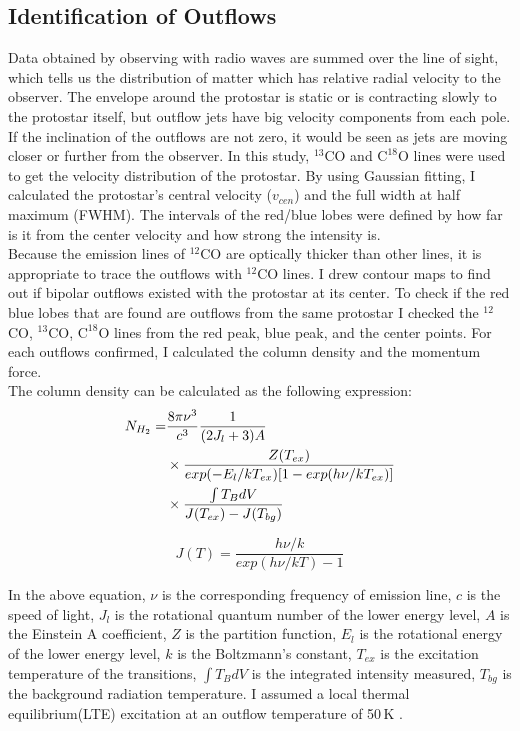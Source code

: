 \subsection{Identification of Outflows}
Data obtained by observing with radio waves are summed over the line of sight, which tells us the distribution of matter which has relative radial velocity to the observer. The envelope around the protostar is static or is contracting slowly to the protostar itself, but outflow jets have big velocity components from each pole. If the inclination of the outflows are not zero, it would be seen as jets are moving closer or further from the observer. In this study, $^{13}$CO and $\textrm{C}^{18}\textrm{O}$ lines were used to get the velocity distribution of the protostar. By using Gaussian fitting, I calculated the protostar’s central velocity ($v_{cen}$) and the full width at half maximum (FWHM). The intervals of the red/blue lobes were defined by how far is it from the center velocity and how strong the intensity is. \\
Because the emission lines of $^{12}$CO are optically thicker than other lines, it is appropriate to trace the outflows with $^{12}$CO lines. I drew contour maps to find out if bipolar outflows existed with the protostar at its center. To check if the red blue lobes that are found are outflows from the same protostar I checked the $^{12}$CO, $^{13}$CO, $\textrm{C}^{18}\textrm{O}$ lines from the red peak, blue peak, and the center points. For each outflows confirmed, I calculated the column density and the momentum force.\\


The column density can be calculated as the following expression:
\begin{align}
N_{H_2} =& \frac{8\pi \nu^3}{c^3} \frac{1}{(2J_l +3)A}  \notag \\
& \times \frac{Z(T_{ex})}{exp(-E_l / kT_{ex})[1-exp(h\nu / kT_{ex})]} \notag \\
& \times \frac{\int T_B dV}{J(T_{ex})-J(T_{bg})}
\end{align}

\begin{equation}
J(T) = \frac{h \nu / k}{exp(h\nu / kT)-1}
\end{equation}

In the above equation, $\nu$ is the corresponding frequency of emission line, $c$ is the speed of light, $J_l$ is the rotational quantum number of the lower energy level, $A$ is the Einstein A coefficient, $Z$ is the partition function, $E_l$ is the rotational energy of the lower energy level, $k$ is the Boltzmann's constant, $T_{ex}$ is the excitation temperature of the transitions, $\int T_B dV$ is the integrated intensity measured, $T_{bg}$ is the background radiation temperature. I assumed a local thermal equilibrium(LTE) excitation at an outflow temperature of 50$\,$K \cite{takahashi2008millimeter}.\\


